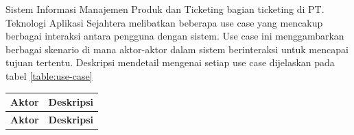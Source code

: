 \documentclass[12pt]{article}
\begin{document}
\begin{enumerate}[label=\textbf{4.\arabic*.}]
\begin{enumerate}[label=\textbf{4.1.\arabic*.}, wide, labelwidth=!, labelindent=0pt]
        Sistem Informasi Manajemen Produk dan Ticketing bagian ticketing di PT. Teknologi Aplikasi Sejahtera melibatkan beberapa use case yang mencakup berbagai interaksi antara pengguna dengan sistem. Use case ini menggambarkan berbagai skenario di mana aktor-aktor dalam sistem berinteraksi untuk mencapai tujuan tertentu. Deskripsi mendetail mengenai setiap use case dijelaskan pada tabel \ref{table:use-case}

        \begin{longtable}{|l|p{}|}
            \hline
            \textbf{Aktor} & \textbf{Deskripsi} \\
            \hline
            \endfirsthead
          
            \hline
            \textbf{Aktor} & \textbf{Deskripsi} \\
            \hline
            \endhead
          

\end{longtable}
\end{enumerate}
\end{enumerate}
\end{document}
